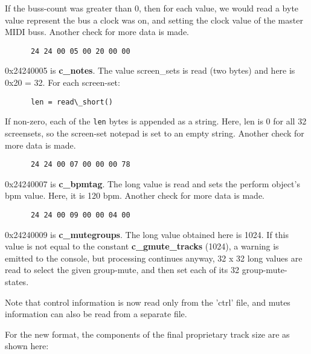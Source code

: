    If the buss-count was greater than 0, then for each value, we would read a
   byte value represent the bus a clock was on, and setting the clock value
   of the master MIDI buss.
   Another check for more data is made.

   \begin{verbatim}
      24 24 00 05 00 20 00 00
   \end{verbatim}

   0x24240005 is \textbf{c\_notes}.  The value screen\_sets is read (two
   bytes) and
   here is 0x20 = 32.  For each screen-set:

   \begin{verbatim}
      len = read\_short()
   \end{verbatim}

   If non-zero, each of the \texttt{len} bytes is appended as a string.
   Here, len is 0 for all 32 screensets, so the screen-set notepad is set to
   an empty string.
   Another check for more data is made.

   \begin{verbatim}
      24 24 00 07 00 00 00 78
   \end{verbatim}

   0x24240007 is \textbf{c\_bpmtag}.  The long value is read and sets the
   perform object's bpm value.  Here, it is 120 bpm.
   Another check for more data is made.

   \begin{verbatim}
      24 24 00 09 00 00 04 00
   \end{verbatim}

   0x24240009 is \textbf{c\_mutegroups}.  The long value obtained here is
   1024.  If this value is not equal to the constant
   \textbf{c\_gmute\_tracks} (1024), a warning is emitted to the console,
   but processing continues anyway, 32 x 32 long values are read to select
   the given group-mute, and then set each of its 32 group-mute-states.

   Note that control information is now read only from the 'ctrl' file,
   and mutes information can also be read from a separate file.

   For the new format, the components of the final proprietary track size are
   as shown here:

